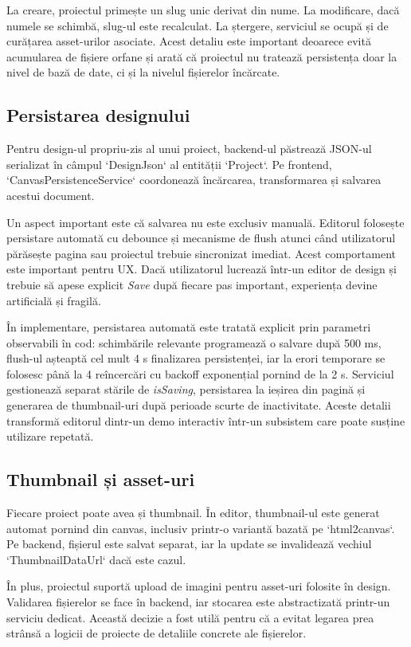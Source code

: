 La creare, proiectul primește un slug unic derivat din nume. La modificare, dacă numele se schimbă, slug-ul este recalculat. La ștergere, serviciul se ocupă și de curățarea asset-urilor asociate. Acest detaliu este important deoarece evită acumularea de fișiere orfane și arată că proiectul nu tratează persistența doar la nivel de bază de date, ci și la nivelul fișierelor încărcate.

\subsection{Persistarea designului}

Pentru design-ul propriu-zis al unui proiect, backend-ul păstrează JSON-ul serializat în câmpul `DesignJson` al entității `Project`. Pe frontend, `CanvasPersistenceService` coordonează încărcarea, transformarea și salvarea acestui document.

Un aspect important este că salvarea nu este exclusiv manuală. Editorul folosește persistare automată cu debounce și mecanisme de flush atunci când utilizatorul părăsește pagina sau proiectul trebuie sincronizat imediat. Acest comportament este important pentru UX. Dacă utilizatorul lucrează într-un editor de design și trebuie să apese explicit \textit{Save} după fiecare pas important, experiența devine artificială și fragilă.

În implementare, persistarea automată este tratată explicit prin parametri observabili în cod: schimbările relevante programează o salvare după 500 ms, flush-ul așteaptă cel mult 4 s finalizarea persistenței, iar la erori temporare se folosesc până la 4 reîncercări cu backoff exponențial pornind de la 2 s. Serviciul gestionează separat stările de \textit{isSaving}, persistarea la ieșirea din pagină și generarea de thumbnail-uri după perioade scurte de inactivitate. Aceste detalii transformă editorul dintr-un demo interactiv într-un subsistem care poate susține utilizare repetată.

\subsection{Thumbnail și asset-uri}

Fiecare proiect poate avea și thumbnail. În editor, thumbnail-ul este generat automat pornind din canvas, inclusiv printr-o variantă bazată pe `html2canvas`. Pe backend, fișierul este salvat separat, iar la update se invalidează vechiul `ThumbnailDataUrl` dacă este cazul.

În plus, proiectul suportă upload de imagini pentru asset-uri folosite în design. Validarea fișierelor se face în backend, iar stocarea este abstractizată printr-un serviciu dedicat. Această decizie a fost utilă pentru că a evitat legarea prea strânsă a logicii de proiecte de detaliile concrete ale fișierelor.

